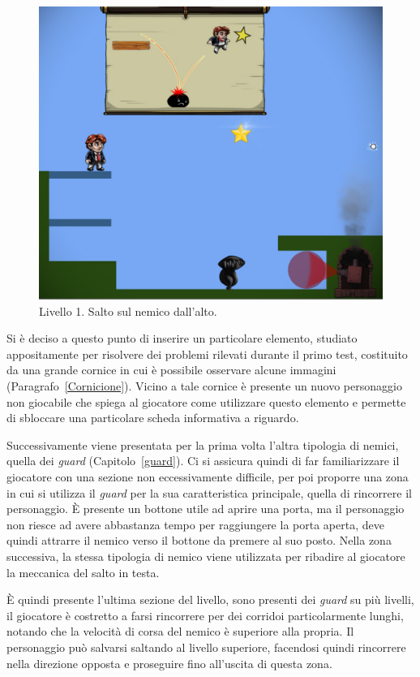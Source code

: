\begin{figure}%
	\centering
	\includegraphics[width= 0.6\columnwidth]{images/gameDesign/47_salto_alto.jpg}
	\caption{Livello 1. Salto sul nemico dall'alto.}
	\label{fig:livello1_salto_alto}
\end{figure}

Si è deciso a questo punto di inserire un particolare elemento, studiato appositamente per risolvere dei problemi rilevati durante il primo test, costituito da una grande cornice in cui è possibile osservare alcune immagini (Paragrafo~\ref{Cornicione}). Vicino a tale cornice è presente un nuovo personaggio non giocabile che spiega al giocatore come utilizzare questo elemento e permette di sbloccare una particolare scheda informativa a riguardo.

Successivamente viene presentata per la prima volta l’altra tipologia di nemici, quella dei \textit{guard} (Capitolo~\ref{guard}). Ci si assicura quindi di far familiarizzare il giocatore con una sezione non eccessivamente difficile, per poi proporre una zona in cui si utilizza il \textit{guard} per la sua caratteristica principale, quella di rincorrere il personaggio. È presente un bottone utile ad aprire una porta, ma il personaggio non riesce ad avere abbastanza tempo per raggiungere la porta aperta, deve quindi attrarre il nemico verso il bottone da premere al suo posto. Nella zona successiva, la stessa tipologia di nemico viene utilizzata per ribadire al giocatore la meccanica del salto in testa. 

È quindi presente l’ultima sezione del livello, sono presenti dei \textit{guard} su più livelli, il giocatore è costretto a farsi rincorrere per dei corridoi particolarmente lunghi, notando che la velocità di corsa del nemico è superiore alla propria. Il personaggio può salvarsi saltando al livello superiore, facendosi quindi rincorrere nella direzione opposta e proseguire fino all’uscita di questa zona.

